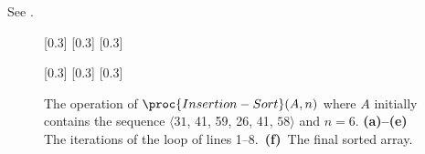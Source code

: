 See .
\begin{figure}[htb]
    \hfill\subcaptionbox{\label{fig:2.1-1a}}[0.3\textwidth]{}
    \hfill\subcaptionbox{\label{fig:2.1-1b}}[0.3\textwidth]{}
    \hfill\subcaptionbox{\label{fig:2.1-1c}}[0.3\textwidth]{}
    \par\medskip
    \hfill\subcaptionbox{\label{fig:2.1-1d}}[0.3\textwidth]{}
    \hfill\subcaptionbox{\label{fig:2.1-1e}}[0.3\textwidth]{}
    \hfill\subcaptionbox{\label{fig:2.1-1f}}[0.3\textwidth]{}
    \caption{The operation of $\proc{Insertion-Sort}(A,n)$ where $A$ initially contains the sequence $\langle31$, 41, 59, 26, 41, $58\rangle$ and $n=6$.
    \textbf{(a)--(e)}\, The iterations of the  loop of lines 1--8.\,
    \textbf{(f)}\, The final sorted array.} \label{fig:2.1-1}
\end{figure}
